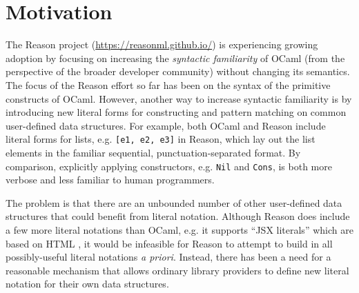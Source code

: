 \documentclass[acmsmall,review]{acmart}
\newcommand{\li}[1]{\lstinline[basicstyle=\ttfamily\fontsize{9pt}{1em}\selectfont]{#1}}
\theoremstyle{slplain}
\numberwithin{thm}{section}
\begin{document}




\maketitle
\thispagestyle{empty} %

\section{Motivation}

The Reason project (\url{https://reasonml.github.io/}) is experiencing growing adoption by focusing on increasing the \emph{syntactic familiarity} of OCaml (from the perspective of the broader developer community) without changing its semantics. The focus of the Reason effort so far has been on the syntax of the primitive constructs of OCaml. However, another way to increase syntactic familiarity is by introducing new {literal forms} for constructing and pattern matching on  common user-defined data structures. For example, both OCaml and Reason include literal forms for lists, e.g. \li{[e1, e2, e3]} in Reason, which lay out the list elements in the familiar sequential, punctuation-separated format. By comparison, explicitly applying constructors, e.g. \li{Nil} and \li{Cons}, is both more verbose and less familiar to human programmers.

The problem is that there are an  unbounded number of other user-defined data structures that could benefit from literal notation. Although Reason does include a few more literal notations than OCaml, e.g. it supports ``JSX literals'' which are based on HTML \cite{JSX}, it would be infeasible for Reason to attempt to build in all possibly-useful literal notations \emph{a priori}. Instead, there has been a need for a reasonable mechanism that allows ordinary library providers to define new literal notation for their own data structures.
\end{document}
